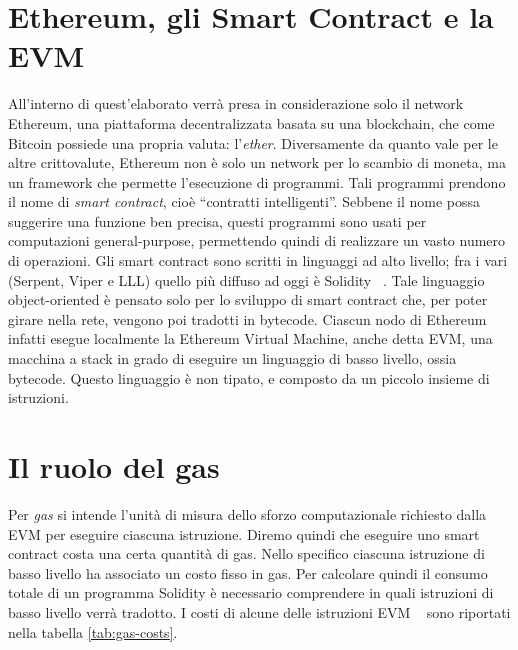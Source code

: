 \section{Ethereum, gli Smart Contract e la EVM}

All'interno di quest'elaborato verrà presa in considerazione solo il network Ethereum, una piattaforma decentralizzata basata su una blockchain, che come Bitcoin possiede una propria valuta: l'\textit{ether}.\newline 
Diversamente da quanto vale per le altre crittovalute, Ethereum non è solo un network per lo scambio di moneta, ma un framework che permette l'esecuzione di programmi. Tali programmi prendono il nome di \textit{smart contract}, cioè ``contratti intelligenti''. Sebbene il nome possa suggerire una funzione ben precisa, questi programmi sono usati per computazioni general-purpose, permettendo quindi di realizzare un vasto numero di operazioni.\newline
Gli smart contract sono scritti in linguaggi ad alto livello; fra i vari (Serpent, Viper e LLL) quello più diffuso ad oggi è Solidity ~\cite{ethereum/solidity_2019}. 
Tale linguaggio object-oriented è pensato solo per lo sviluppo di smart contract che, per poter girare nella rete, vengono poi tradotti in bytecode. Ciascun nodo di Ethereum infatti esegue localmente la Ethereum Virtual Machine, anche detta EVM, una macchina a stack in grado di eseguire un linguaggio di basso livello, ossia bytecode. Questo linguaggio è non tipato, e composto da un piccolo insieme di istruzioni.\newline 

\section{Il ruolo del gas}

Per \textit{gas} si intende l'unità di misura dello sforzo computazionale richiesto dalla EVM per eseguire ciascuna istruzione. Diremo quindi che eseguire uno smart contract costa una certa quantità di gas.\newline
Nello specifico ciascuna istruzione di basso livello ha associato un costo fisso in gas. Per calcolare quindi il consumo totale di un programma Solidity è necessario comprendere in quali istruzioni di basso livello verrà tradotto.\newline
I costi di alcune delle istruzioni EVM ~\cite{wood2014ethereum} sono riportati nella tabella \ref{tab:gas-costs}.

